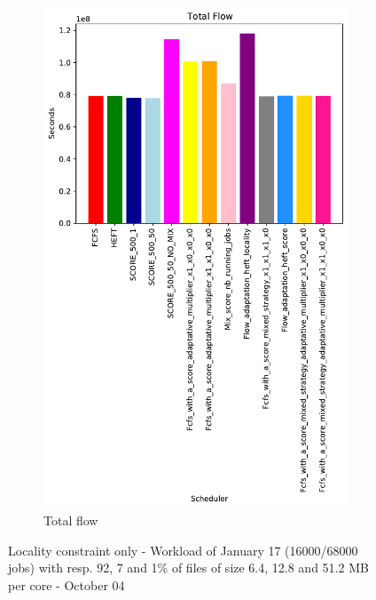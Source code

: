 \documentclass[a4paper]{article}
\begin{document}
\begin{figure}[H]
\begin{subfigure}[b]{0.4\linewidth}\centering\includegraphics[width=0.9\linewidth]{MBSS/plot/Results_FCFS_Score_Adaptative_Multiplier_2022-01-17->2022-01-17_V9271_Total_flow_450_128_32_256_4_1024.pdf}\caption{Total flow}\end{subfigure}
\caption{Locality constraint only - Workload of January 17 (16000/68000 jobs) with resp. 92, 7 and 1\% of files of size 6.4, 12.8 and 51.2 MB per core - October 04}\end{figure}
\end{document}
